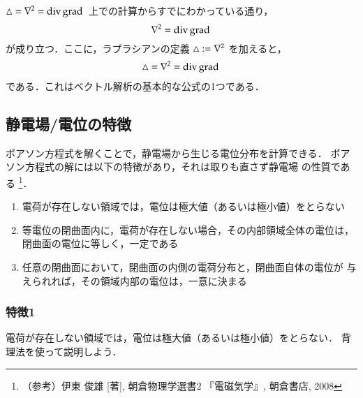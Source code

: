            \begin{memo}{$\triangle = {\nabla}^{2} = \mathrm{div}\, \mathrm{grad}\,$}
                上での計算からすでにわかっている通り，
                    \begin{equation*}
                        {\nabla}^{2}=\mathrm{div}\, \mathrm{grad}\,
                    \end{equation*}
                が成り立つ．ここに，ラプラシアンの定義 $\triangle:={\nabla}^{2}$ を加えると，
                \begin{align}
                       \triangle = {\nabla}^{2}= \mathrm{div}\, \mathrm{grad}\,
                \end{align}
                である．これはベクトル解析の基本的な公式の1つである．
            \end{memo}

        \subsection{静電場/電位の特徴}\label{subsec:staticEF_char}
            ポアソン方程式を解くことで，静電場から生じる電位分布を計算できる．
            ポアソン方程式の解には以下の特徴があり，それは取りも直さず静電場
            の性質である
                \footnote{
                    （参考）伊東 俊雄 [著], 朝倉物理学選書2 『電磁気学』, 朝倉書店, 2008
                }．
            \begin{enumerate}
                \item 電荷が存在しない領域では，電位は極大値（あるいは極小値）をとらない
                \item 等電位の閉曲面内に，電荷が存在しない場合，その内部領域全体の電位は，
                      閉曲面の電位に等しく，一定である
                \item 任意の閉曲面において，閉曲面の内側の電荷分布と，閉曲面自体の電位が
                      与えられれば，その領域内部の電位は，一意に決まる
            \end{enumerate}

        \subsubsection{特徴1}\label{subsubsec:char1}
            電荷が存在しない領域では，電位は極大値（あるいは極小値）をとらない．
            背理法を使って説明しよう．

